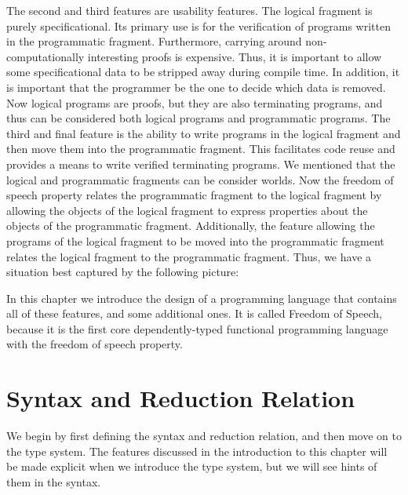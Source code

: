 The second and third features are usability features.  The logical
fragment is purely specificational.  Its primary use is for the
verification of programs written in the programmatic fragment.
Furthermore, carrying around non-computationally interesting proofs is
expensive.  Thus, it is important to allow some specificational data
to be stripped away during compile time.  In addition, it is important
that the programmer be the one to decide which data is removed.  Now
logical programs are proofs, but they are also terminating programs,
and thus can be considered both logical programs and programmatic
programs.  The third and final feature is the ability to write
programs in the logical fragment and then move them into the
programmatic fragment.  This facilitates code reuse and provides a
means to write verified terminating programs.  We mentioned that the
logical and programmatic fragments can be consider worlds.  Now the
freedom of speech property relates the programmatic fragment to the
logical fragment by allowing the objects of the logical fragment to
express properties about the objects of the programmatic fragment.
Additionally, the feature allowing the programs of the logical
fragment to be moved into the programmatic fragment relates the
logical fragment to the programmatic fragment.  Thus, we have a
situation best captured by the following picture:
\begin{center}
\end{center}
In this chapter we introduce the design of a programming language that
contains all of these features, and some additional ones.  It is
called Freedom of Speech, because it is the first core
dependently-typed functional programming language with the freedom of
speech property.

\section{Syntax and Reduction Relation}
\label{sec:syntax_and_reduction_relation}
We begin by first defining the syntax and reduction relation, and then
move on to the type system.  The features discussed in the
introduction to this chapter will be made explicit when we introduce
the type system, but we will see hints of them in the syntax.

